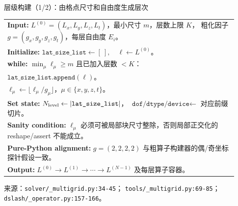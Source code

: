 \documentclass[UTF8,aspectratio=169,11pt]{ctexbeamer}
\newcommand{\source}[1]{%
  \vspace{0.06em}\par{\raggedright\scriptsize\color{muted}来源：#1\par}}
\newcommand{\pathref}[1]{\nolinkurl{#1}}
\begin{document}
\begin{frame}[t]{层级构建（1/2）：由格点尺寸和自由度生成层次}
  \begin{center}
    \small
    \begin{tabular}{@{}p{0.93\linewidth}@{}}
      \toprule
      \textbf{Input:}\quad
      $L^{(0)}=(L_x,L_y,L_z,L_t)$，最小尺寸 $m$，层数上限 $K$，
      粗化因子 $g=(g_x,g_y,g_z,g_t)$，每层自由度 $E_i$。
      \\
      \textbf{Initialize:}\quad
      $\texttt{lat\_size\_list}\gets[\ ],\quad\ell\gets L^{(0)}$。
      \\
      \textbf{while:}\quad
      $\min_\mu \ell_\mu\ge m$ 且已加入层数 $<K$：
      \\
      \quad $\texttt{lat\_size\_list.append}(\ell)$。
      \\
      \quad $\ell_\mu\gets\lfloor\ell_\mu/g_\mu\rfloor$，$\mu\in\{x,y,z,t\}$。
      \\
      \textbf{Set state:}\quad
      $N_{\rm level}\gets|\texttt{lat\_size\_list}|$，
      $\texttt{dof/dtype/device}\gets$ 对应前缀切片。
      \\
      \textbf{Sanity condition:}\quad
      $\ell_\mu$ 必须可被局部块尺寸整除，否则局部正交化的 reshape/assert 不能成立。
      \\
      \textbf{Pure-Python alignment:}\quad
      $g=(2,2,2,2)$ 与粗算子构建器的偶/奇坐标探针假设一致。
      \\
      \textbf{Output:}\quad
      $L^{(0)}\to L^{(1)}\to\cdots\to L^{(N-1)}$ 及每层算子容器。
      \\
      \bottomrule
    \end{tabular}
  \end{center}
  \source{\pathref{solver/_multigrid.py:34-45}；
  \pathref{tools/_multigrid.py:69-85}；
  \pathref{dslash/_operator.py:157-166}。}
\end{frame}
\end{document}
